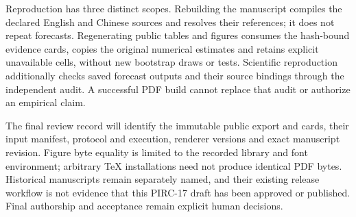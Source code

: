 \documentclass[11pt]{article}
\begin{document}
Reproduction has three distinct scopes. Rebuilding the manuscript compiles
the declared English and Chinese sources and resolves their references;
it does not repeat forecasts. Regenerating public tables and figures consumes
the hash-bound evidence cards, copies the original numerical estimates and
retains explicit unavailable cells, without new bootstrap draws or tests.
Scientific reproduction additionally checks saved forecast outputs and their
source bindings through the independent audit. A successful PDF build cannot
replace that audit or authorize an empirical claim.

The final review record will identify the immutable public export and cards,
their input manifest, protocol and execution, renderer versions and exact
manuscript revision. Figure byte equality is limited to the recorded library
and font environment; arbitrary TeX installations need not produce identical
PDF bytes. Historical manuscripts remain separately named, and their existing
release workflow is not evidence that this PIRC-17 draft has been approved
or published. Final authorship and acceptance remain explicit human decisions.
\end{document}
